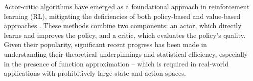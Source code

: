 

Actor-critic algorithms have emerged as a foundational approach in reinforcement learning (RL), mitigating the deficiencies of both policy-based and value-based approaches \citep{sutton1998, mnih2016asynchronousmethodsdeepreinforcement, haarnoja2018soft}. 
These methods combine two components: an actor, which directly learns and improves the policy, and a critic, which evaluates the policy's quality. 
Given their popularity, significant recent progress has been made in understanding their theoretical underpinnings and statistical efficiency, especially in the presence of function approximation \citep{cai2020provably, zhong2023theoretical, sherman2023rate, liu2023optimistic} -- which is required in real-world applications with prohibitively large state and action spaces.

